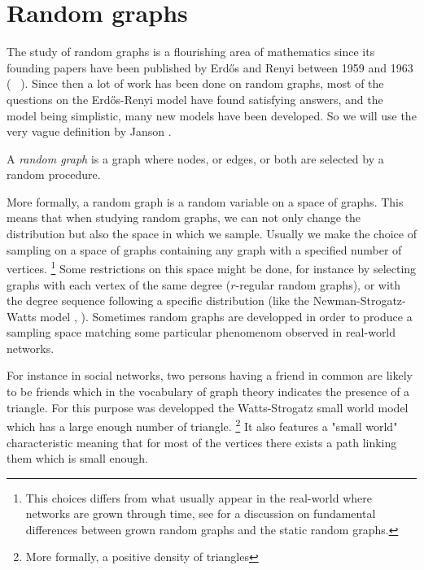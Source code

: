\section{Random graphs}
The study of random graphs is a flourishing area of mathematics since its founding papers have been published by Erd\H{o}s and Renyi between 1959 and 1963 (\cite{erdos59} \cite{erdos60} \cite{erdosconnect61} \cite{erdosevol61} \cite{erdos63}).
Since then a lot of work has been done on random graphs, most of the questions on the Erd\H{o}s-Renyi model have found satisfying answers, and the model being simplistic, many new models have been developed.
So we will use the very vague definition by Janson \cite{Janson14}.
\begin{definition}
	A \emph{random graph} is a graph where nodes, or edges, or both are selected by a random procedure.
\end{definition}
More formally, a random graph is a random variable on a space of graphs.
This means that when studying random graphs, we can not only change the distribution but also the space in which we sample.
\newline
Usually we make the choice of sampling on a space of graphs containing any graph with a specified number of vertices.
\footnote{This choices differs from what usually appear in the real-world where networks are grown through time, see \cite{CHKNS01} for a discussion on fundamental differences between grown random graphs and the static random graphs.}
Some restrictions on this space might be done, for instance by selecting graphs with each vertex of the same degree ($r$-regular random graphs), or with the degree sequence following a specific distribution (like the Newman-Strogatz-Watts model \cite{Newman01}, \cite{Newman02}).
Sometimes random graphs are developped in order to produce a sampling space matching  some particular phenomenom observed in real-world networks.

For instance in social networks, two persons having a friend in common are likely to be friends which in the vocabulary of graph theory indicates the presence of a triangle.
For this purpose was developped the Watts-Strogatz small world model \cite{WattsStrogatz98} which has a large enough number of triangle. 
\footnote{More formally, a positive density of triangles}
It also features a "small world" characteristic meaning that for most of the vertices there exists a path linking them which is small enough.
\newline

